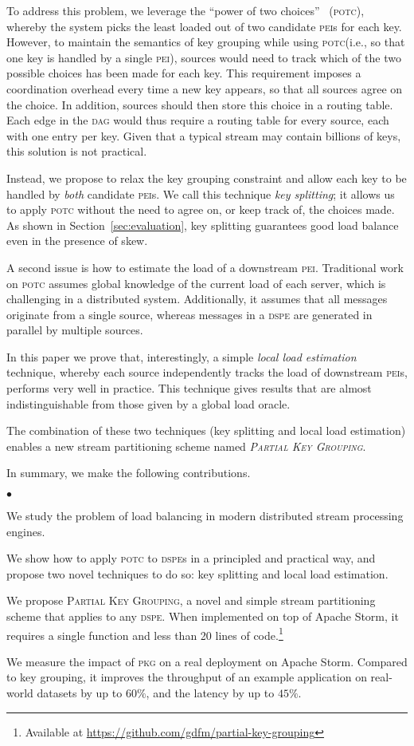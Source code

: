 \documentclass[10pt,conference,letterpaper]{IEEEtran}
\newenvironment {squishlist}
{\begin{list}{$\bullet$}
  { \setlength{\itemsep}{1pt}
     \setlength{\parsep}{1pt}
     \setlength{\topsep}{1pt}
     \setlength{\partopsep}{1pt}
     \setlength{\leftmargin}{1.5em}
     \setlength{\labelwidth}{1em}
     \setlength{\labelsep}{0.5em} } }
{\end{list}}
\newcommand{\pei}{\textsc{pei}\xspace}
\newcommand{\peis}{{\pei}s\xspace}
\newcommand{\potc}{\textsc{p\textup{o}tc}\xspace}
\newcommand{\dspe}{\textsc{dspe}\xspace}
\newcommand{\dspes}{{\dspe}s\xspace}
\newcommand{\dagr}{\textsc{dag}\xspace}
\newcommand{\pkg}{\textsc{Partial Key Grouping}\xspace}
\newcommand{\pkgs}{\textsc{pkg}\xspace}
\begin{document}
\clearpage

To address this problem, we leverage the ``power of two choices''~\citep{mitzenmacher2001power} (\potc), whereby the system picks the least loaded out of two candidate \peis for each key.
However, to maintain the semantics of key grouping while using \potc (i.e., so that one key is handled by a single \pei), sources would need to track which of the two possible choices has been made for each key.
This requirement imposes a coordination overhead every time a new key appears, so that all sources agree on the choice.
In addition, sources should then store this choice in a routing table. 
Each edge in the \dagr would thus require a routing table for every source, each with one entry per key.
Given that a typical stream may contain billions of keys, this solution is not practical.

Instead, we propose to relax the key grouping constraint and allow each key to be handled by \emph{both} candidate \peis.
We call this technique \emph{key splitting}; it allows us to apply \potc without the need to agree on, or keep track of, the choices made.
As shown in Section~\ref{sec:evaluation}, key splitting guarantees good load balance even in the presence of skew.

A second issue is how to estimate the load of a downstream \pei.
Traditional work on \potc assumes global knowledge of the current load of each server, which is challenging in a distributed system.
Additionally, it assumes that all messages originate from a single source, whereas messages in a \dspe are generated in parallel by multiple sources.


In this paper we prove that, interestingly, a simple \emph{local load estimation} technique, whereby each source independently tracks the load of downstream \peis, performs very well in practice.
This technique gives results that are almost indistinguishable from those given by a global load oracle.


The combination of these two techniques (key splitting and local load estimation) enables a new stream partitioning scheme named \emph{\pkg}.




In summary, we make the following contributions.
\begin{squishlist}
\item We study the problem of load balancing in modern distributed stream processing engines.
\item We show how to apply \potc to \dspes in a principled and practical way, and propose two novel techniques to do so: key splitting and local load estimation.
\item We propose \pkg, a novel and simple stream partitioning scheme that applies to any \dspe.
When implemented on top of Apache Storm, it requires a single function and less than 20 lines of code.\footnote{Available at \url{https://github.com/gdfm/partial-key-grouping}}
\item We measure the impact of \pkgs on a real deployment on Apache Storm.
Compared to key grouping, it improves the throughput of an example application on real-world datasets by up to $60\%$, and the latency by up to $45\%$.
\end{squishlist}
\end{document}
